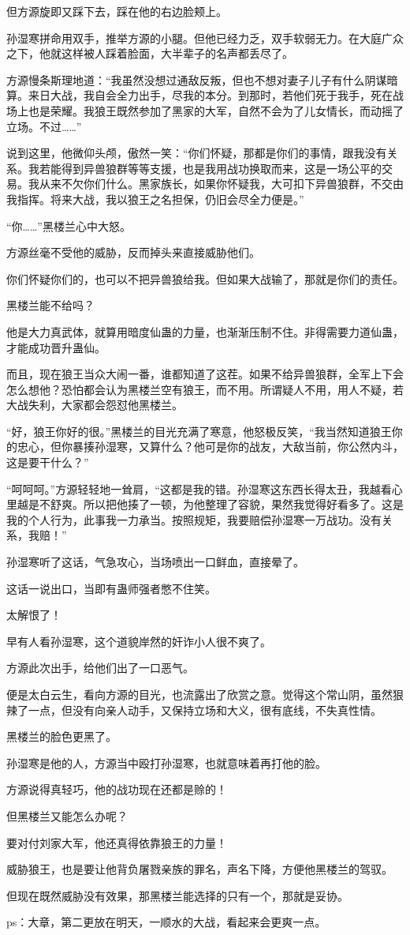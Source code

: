 \begin{this_body}
但方源旋即又踩下去，踩在他的右边脸颊上。

孙湿寒拼命用双手，推举方源的小腿。但他已经力乏，双手软弱无力。在大庭广众之下，他就这样被人踩着脸面，大半辈子的名声都丢尽了。

方源慢条斯理地道：“我虽然没想过通敌反叛，但也不想对妻子儿子有什么阴谋暗算。来日大战，我自会全力出手，尽我的本分。到那时，若他们死于我手，死在战场上也是荣耀。我狼王既然参加了黑家的大军，自然不会为了儿女情长，而动摇了立场。不过……”

说到这里，他微仰头颅，傲然一笑：“你们怀疑，那都是你们的事情，跟我没有关系。我若能得到异兽狼群等等支援，也是我用战功换取而来，这是一场公平的交易。我从来不欠你们什么。黑家族长，如果你怀疑我，大可扣下异兽狼群，不交由我指挥。将来大战，我以狼王之名担保，仍旧会尽全力便是。”

“你……”黑楼兰心中大怒。

方源丝毫不受他的威胁，反而掉头来直接威胁他们。

你们怀疑你们的，也可以不把异兽狼给我。但如果大战输了，那就是你们的责任。

黑楼兰能不给吗？

他是大力真武体，就算用暗度仙蛊的力量，也渐渐压制不住。非得需要力道仙蛊，才能成功晋升蛊仙。

而且，现在狼王当众大闹一番，谁都知道了这茬。如果不给异兽狼群，全军上下会怎么想他？恐怕都会认为黑楼兰空有狼王，而不用。所谓疑人不用，用人不疑，若大战失利，大家都会怨怼他黑楼兰。

“好，狼王你好的很。”黑楼兰的目光充满了寒意，他怒极反笑，“我当然知道狼王你的忠心，但你暴揍孙湿寒，又算什么？他可是你的战友，大敌当前，你公然内斗，这是要干什么？”

“呵呵呵。”方源轻轻地一耸肩，“这都是我的错。孙湿寒这东西长得太丑，我越看心里越是不舒爽。所以把他揍了一顿，为他整理了容貌，果然我觉得好看多了。这是我的个人行为，此事我一力承当。按照规矩，我要赔偿孙湿寒一万战功。没有关系，我赔！”

孙湿寒听了这话，气急攻心，当场喷出一口鲜血，直接晕了。

这话一说出口，当即有蛊师强者憋不住笑。

太解恨了！

早有人看孙湿寒，这个道貌岸然的奸诈小人很不爽了。

方源此次出手，给他们出了一口恶气。

便是太白云生，看向方源的目光，也流露出了欣赏之意。觉得这个常山阴，虽然狠辣了一点，但没有向亲人动手，又保持立场和大义，很有底线，不失真性情。

黑楼兰的脸色更黑了。

孙湿寒是他的人，方源当中殴打孙湿寒，也就意味着再打他的脸。

方源说得真轻巧，他的战功现在还都是赊的！

但黑楼兰又能怎么办呢？

要对付刘家大军，他还真得依靠狼王的力量！

威胁狼王，也是要让他背负屠戮亲族的罪名，声名下降，方便他黑楼兰的驾驭。

但现在既然威胁没有效果，那黑楼兰能选择的只有一个，那就是妥协。

ps：大章，第二更放在明天，一顺水的大战，看起来会更爽一点。

\end{this_body}

